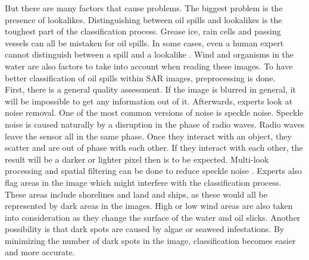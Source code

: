 But there are many factors that cause problems. The biggest problem is the presence of lookalikes. Distinguishing between oil spills and lookalikes is the toughest part of the classification process. Grease ice, rain cells and passing vessels can all be mistaken for oil spills\cite{Brekke200595}. In some cases, even a human expert cannot distinguish between a spill and a lookalike \cite{Keramitsoglou2006640}. Wind and organisms in the water are also factors to take into account when reading these images. To have better classification of oil spills within SAR images, preprocessing is done. \\
First, there is a general quality assessment. If the image is blurred in general, it will be impossible to get any information out of it. Afterwards, experts look at noise removal. One of the most common versions of noise is speckle noise. Speckle noise is caused naturally by a disruption in the phase of radio waves. Radio waves leave the sensor all in the same phase. Once they interact with an object, they scatter and are out of phase with each other. If they interact with each other, the result will be a darker or lighter pixel then is to be expected. Multi-look processing and spatial filtering can be done to reduce speckle noise \cite{simard1998analysis}. Experts also flag areas in the image which might interfere with the classification process. These areas include shorelines and land and ships, as these would all be represented by dark areas in the images.
High or low wind areas are also taken into consideration as they change the surface of the water and oil slicks. Another possibility is that dark spots are caused by algae or seaweed infestations\cite{fingas2014review}.  By minimizing the number of dark spots in the image, classification becomes easier and more accurate.
